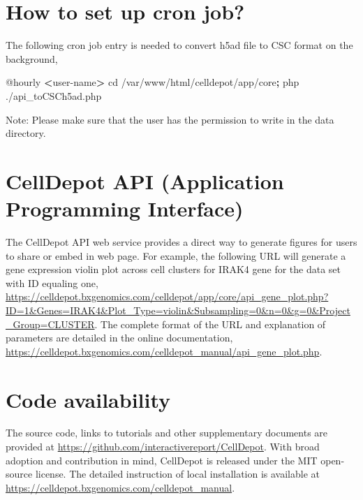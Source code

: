 \documentclass[runningheads]{llncs}
\newenvironment{Shaded}{\begin{snugshade}}{\end{snugshade}}
\newcommand{\ExtensionTok}[1]{#1}
\newcommand{\KeywordTok}[1]{\textcolor[rgb]{0.13,0.29,0.53}{\textbf{#1}}}
\newcommand{\NormalTok}[1]{#1}
\newcommand{\OperatorTok}[1]{\textcolor[rgb]{0.81,0.36,0.00}{\textbf{#1}}}
\begin{document}
\hypertarget{cron}{%
\section{How to set up cron job?}\label{cron}}

The following cron job entry is needed to convert h5ad file to CSC format on the background,

\begin{Shaded}
\begin{Highlighting}[]
\ExtensionTok{@hourly} \OperatorTok{\textless{}}\NormalTok{user{-}name}\OperatorTok{\textgreater{}}\NormalTok{ cd /var/www/html/celldepot/app/core}\KeywordTok{;} \ExtensionTok{php}\NormalTok{ ./api\_toCSCh5ad.php}
\end{Highlighting}
\end{Shaded}

Note: Please make sure that the user has the permission to write in the data directory.

\hypertarget{celldepot-api-application-programming-interface}{%
\section{CellDepot API (Application Programming Interface)}\label{celldepot-api-application-programming-interface}}

The CellDepot API web service provides a direct way to generate figures for users to share or embed in web page. For example, the following URL will generate a gene expression violin plot across cell clusters for IRAK4 gene for the data set with ID equaling one, \url{https://celldepot.bxgenomics.com/celldepot/app/core/api_gene_plot.php?ID=1\&Genes=IRAK4\&Plot_Type=violin\&Subsampling=0\&n=0\&g=0\&Project_Group=CLUSTER}. The complete format of the URL and explanation of parameters are detailed in the online documentation, \url{https://celldepot.bxgenomics.com/celldepot_manual/api_gene_plot.php}.

\hypertarget{code-availability}{%
\section{Code availability}\label{code-availability}}

The source code, links to tutorials and other supplementary documents are provided at \url{https://github.com/interactivereport/CellDepot}. With broad adoption and contribution in mind, CellDepot is released under the MIT open-source license. The detailed instruction of local installation is available at \url{https://celldepot.bxgenomics.com/celldepot_manual}.
\end{document}
